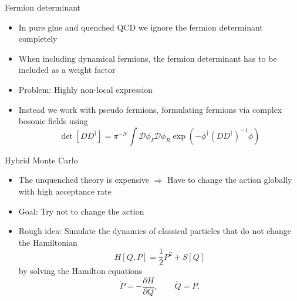 \documentclass[
	english, %
	design=2023, %
	]{tudabeamer}
\newcommand{\sqbr}[1]{\left[#1\right]}
\newcommand{\rbr}[1]{\left(#1\right)}
\begin{document}
\begin{frame}{Fermion determinant}
    \begin{itemize}
    \item In pure glue and quenched QCD we ignore the fermion determinant completely
        \item When including dynamical fermions, the fermion determinant has to be included as a weight factor
        \item Problem: Highly non-local expression
        \item Instead we work with pseudo fermions, formulating fermions via complex bosonic fields using
        \begin{equation}
             \det\sqbr{DD^\dagger}=\pi^{-N}\int\mathcal D\phi_I\mathcal{D}\phi_R\exp\rbr{-\phi^\dagger\rbr{DD^\dagger}^{-1}\phi}
        \end{equation}
    \end{itemize}
\end{frame}

\begin{frame}{Hybrid Monte Carlo}
    \begin{itemize}
        \item The unquenched theory is expensive $\Rightarrow$ Have to change the action globally with high acceptance rate
        \item Goal: Try not to change the action 
        \item Rough idea: Simulate the dynamics of classical particles that do not change the Hamiltonian
        \begin{equation}
            H[Q,P]=\frac{1}{2}P^2+S[Q]
        \end{equation}
        by solving the Hamilton equations
        \begin{equation}
            \dot P =-\frac{\partial H}{\partial Q},\qquad \dot Q=P.
        \end{equation}
    \end{itemize}
\end{frame}
\end{document}
